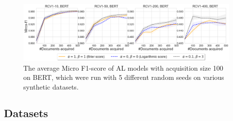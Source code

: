 \documentclass[letterpaper]{article} %
\begin{document}
\begin{figure}[!t]
\centering
\includegraphics[width=1\textwidth]{figures/syn_rcv1meanIR50_mircof1.png}
    \caption{The average Micro F1-score of AL models with acquisition size 100 on BERT, which were run with 5 different random seeds on various synthetic datasets.}
\label{fig:syn_rcv1meanIR50_mircof1}
\end{figure}

\subsection{Datasets}
\end{document}
